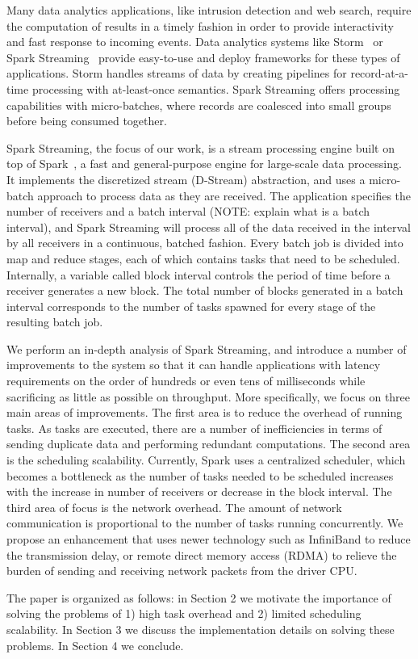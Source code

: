 \noindent

Many data analytics applications, like intrusion detection and web search, require the computation of results in a timely fashion in order to provide interactivity and fast response to incoming events.
Data analytics systems like Storm~\cite{Storm} or Spark Streaming~\cite{SparkStreaming} provide easy-to-use and deploy frameworks for these types of applications. Storm handles streams of data by creating pipelines for record-at-a-time processing with at-least-once semantics. Spark Streaming offers processing capabilities with micro-batches, where records are coalesced into small groups before being consumed together.

%
%
Spark Streaming, the focus of our work, is a stream processing engine built on top of Spark~\cite{Spark}, a fast and general-purpose engine for large-scale data processing. It implements the discretized stream (D-Stream) abstraction, and uses a micro-batch approach to process data as they are received. The application specifies the number of receivers and a batch interval (NOTE: explain what is a batch interval), and Spark Streaming will process all of the data received in the interval by all receivers in a continuous, batched fashion. Every batch job is divided into map and reduce stages, each of which contains tasks that need to be scheduled. Internally, a variable called block interval controls the period of time before a receiver generates a new block. The total number of blocks generated in a batch interval corresponds to the number of tasks spawned for every stage of the resulting batch job.



We perform an in-depth analysis of Spark Streaming, and introduce a number of improvements to the system so that it can handle applications with latency requirements on the order of hundreds or even tens of milliseconds while sacrificing as little as possible on throughput. More specifically, we focus on three main areas of improvements. The first area is to reduce the overhead of running tasks. As tasks are executed, there are a number of inefficiencies in terms of sending duplicate data and performing redundant computations. The second area is the scheduling scalability. Currently, Spark uses a centralized scheduler, which becomes a bottleneck as the number of tasks needed to be scheduled increases with the increase in number of receivers or decrease in the block interval. The third area of focus is the network overhead. The amount of network communication is proportional to the number of tasks running concurrently. We propose an enhancement that uses newer technology such as InfiniBand to reduce the transmission delay, or remote direct memory access (RDMA) to relieve the burden of sending and receiving network packets from the driver CPU.

The paper is organized as follows: in Section 2 we motivate the importance of solving the problems of 1) high task overhead and 2) limited scheduling scalability. In Section 3 we discuss the implementation details on solving these problems. In Section 4 we conclude.

